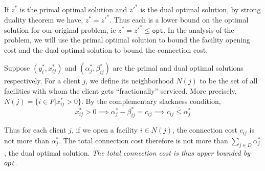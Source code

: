 \documentclass[10pt]{article}
\numberwithin{equation}{section}
\begin{document}
If $z^*$ is the primal optimal solution and $z'^*$ is the dual optimal solution, by strong duality theorem we have, $z^* = z'^*$. Thus each is a lower bound on the optimal solution for our original problem, ie $z^* = z'^* \leq \texttt{opt}$. In the analysis of the problem, we will use the primal optimal solution to bound the facility opening cost and the dual optimal solution to bound the connection cost.

Suppose $(y_i^*, x_{ij}^*)$ and $(\alpha_j^*, \beta_{ij}^*)$ are the primal and dual optimal solutions respectively. For a client $j$, we define its neighborhood $N(j)$ to be the set of all facilities with whom the client gets ``fractionally'' serviced. More precisely, $N(j) = \{i \in F | x_{ij}^* > 0\}$. By the complementary slackness condition, 
\[
x_{ij}^* > 0 \implies \alpha_j^* - \beta_{ij}^* = c_{ij} \implies c_{ij} \leq \alpha_j^*
\]

Thus for each client $j$, if we open a facility $i \in N(j)$, the connection cost $c_{ij}$ is not more than $\alpha_j^*$. The total connection cost therefore is not more than $\sum_{j \in D}\alpha_j^*$, the dual optimal solution. \emph{The total connection cost is thus upper bounded by \texttt{opt}}.
\end{document}
